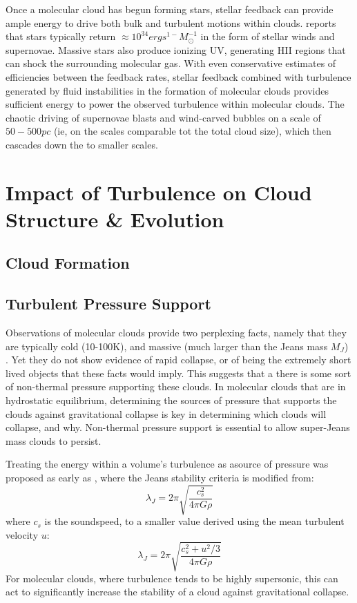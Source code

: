 \documentclass[12pt, preprint]{aastex}
\begin{document}
Once a molecular cloud has begun forming stars, stellar feedback can provide
ample energy to drive both bulk and turbulent motions within clouds.
\citet{agertz2012} reports that stars typically return 
$\approx 10^{34} erg s^{1-} M_\odot^{-1}$ in the form of stellar winds and
supernovae.  Massive stars also produce ionizing UV, generating HII regions that
can shock the surrounding molecular gas.  With even conservative estimates of
efficiencies between the feedback rates, stellar feedback combined with
turbulence generated by fluid instabilities in the formation of molecular clouds
provides sufficient energy to power the observed turbulence within molecular
clouds\citep{elm2004}.  The chaotic driving of supernovae blasts and wind-carved
bubbles on a scale of $50-500pc$ (ie, on the scales comparable tot the total
cloud size), which then cascades down the to smaller scales.
\section{Impact of Turbulence on Cloud Structure \& Evolution}
\subsection{Cloud Formation}
\subsection{Turbulent Pressure Support}
Observations of molecular clouds provide two perplexing facts, namely that they
are typically cold (10-100K), and massive (much larger than the Jeans mass
$M_J$) \citep{gold1978}.  Yet they do not show evidence of rapid collapse, or of being the
extremely short lived objects that these facts would imply.  This suggests that
a there is some sort of non-thermal pressure supporting these clouds.
In molecular clouds that are in hydrostatic equilibrium, determining the sources
of pressure that supports the clouds against gravitational collapse is key in
determining which clouds will collapse, and why.  Non-thermal pressure support is
essential to allow super-Jeans mass clouds to persist.

Treating the energy within a volume's turbulence as  asource of pressure was
proposed as early as \citet{chandra1951}, where the Jeans stability criteria is
modified from:
$$\lambda_J = 2\pi \sqrt{\frac{c_s^2}{4\pi G\rho}}$$
where $c_s$ is the soundspeed, to a smaller value derived using the mean
turbulent velocity $u$:
$$\lambda_J = 2\pi \sqrt{\frac{c_s^2+u^2/3}{4\pi G\rho}}$$
For molecular clouds, where turbulence tends to be highly supersonic, this can
act to significantly increase the stability of a cloud against gravitational
collapse.
\end{document}
